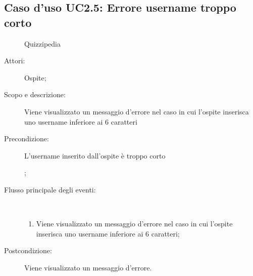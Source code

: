 \subsection{Caso d'uso UC2.5: Errore username troppo corto}
	\begin{figure}[H]
		\centering
		\begin{resizedtikzpicture}{\textwidth}
		\begin{umlsystem}[x=0, fill=lightgray!20]{Quizzipedia}
		\end{umlsystem}
		\end{resizedtikzpicture}
		\caption{}
	\end{figure}
\begin{description}
\item[Attori:] Ospite;
\item[Scopo e descrizione:] Viene visualizzato un messaggio d'errore nel caso in cui l'ospite inserisca uno username inferiore ai 6 caratteri
      \item[Precondizione:] L'username inserito dall'ospite è troppo corto

;

        \item[Flusso principale degli eventi:] \ 
 \begin{enumerate}
          \item Viene visualizzato un messaggio d'errore nel caso in cui l'ospite inserisca uno username inferiore ai 6 caratteri;

      \end{enumerate}
    \item[Postcondizione:] Viene visualizzato un messaggio d'errore.
  \end{description}
\hypertarget{UC2.6}{}
